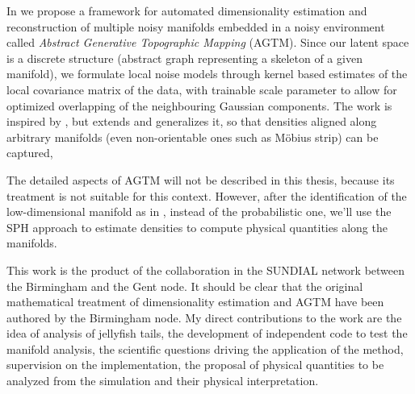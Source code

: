 In \citet{Canducci2021} we propose a framework for automated dimensionality estimation and reconstruction
of multiple noisy manifolds embedded in a noisy environment called \emph{Abstract Generative Topographic Mapping} (AGTM).
Since our latent space is a discrete structure (abstract graph representing a skeleton of a given manifold),
we formulate local noise models through kernel based estimates of the local covariance matrix of the data,
with trainable scale parameter to allow for optimized overlapping of the neighbouring Gaussian components.
The work is inspired by \cite{10.1007/978-3-540-87481-2_37}, but extends and generalizes it, so that densities aligned along arbitrary manifolds (even non-orientable ones such as M\"{o}bius strip) can be captured,

The detailed aspects of AGTM will not be described in this thesis, because its treatment is not suitable for this context.
However, after the identification of the low-dimensional manifold as in \citet{Canducci2021}, instead of the probabilistic one, we'll use the SPH approach to estimate densities to compute physical quantities along the manifolds.

This work is the product of the collaboration in the SUNDIAL network between the Birmingham and the Gent node.
It should be clear that the original mathematical treatment of dimensionality estimation and AGTM have been authored by the Birmingham node.
My direct contributions to the work are the idea of analysis of jellyfish tails, the development of  independent code to test the manifold analysis,
the scientific questions driving the application of the method, supervision on the implementation, the proposal of physical quantities to be analyzed from the simulation and their physical interpretation.

